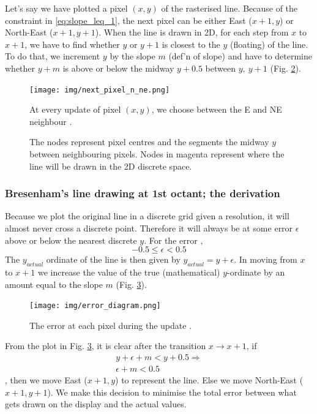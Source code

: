\documentclass[a4paper]{article}
\begin{document}
Let's say we have plotted a pixel $(x,y)$ of the rasterised line. Because of the constraint in \eqref{eq:slope_leq_1}, the next pixel can be either East ($x+1,y$) or North-East ($x+1,y+1$). When the line is drawn in 2D, for each step from $x$ to $x+1$, we have to find whether $y$ or $y+1$ is closest to the $y$ (floating) of the line. To do that, we increment $y$ by the slope $m$ (def'n of slope) and have to determine whether $y+m$ is above or below the midway $y+0.5$  between $y, \ y+1$ (Fig. \ref{fig:grid_line_1st_octant}).

\begin{multicols}{2}
	\begin{figure}[H]
		\centering
		\texttt{[image: img/next\_pixel\_n\_ne.png]}
		\caption{At every update of pixel $(x,y)$, we choose between the E and NE neighbour \cite{mdamian}.}
		\label{fig:}
	\end{figure}
\columnbreak
	\begin{figure}[H]
	\centering
	
	\caption{The nodes represent pixel centres and the segments the midway $y$ between neighbouring pixels. Nodes in magenta represent where the line will be drawn in the 2D discrete space.}
	\label{fig:grid_line_1st_octant}
\end{figure}


\end{multicols}

\subsubsection{Bresenham's line drawing at 1st octant; the derivation}

Because we plot the original line in a discrete grid given a resolution, it will almost never cross a discrete point. Therefore it will always be at some error $\epsilon$ above or below the nearest discrete $y$. For the error \cite{mallinus},
\begin{equation}
	-0.5 \leq \epsilon <0.5
\end{equation}
The $y_{actual}$ ordinate of the line is then given by $y_{actual} = y+\epsilon$. In moving from $x$ to $x+1$ we increase the value of the true (mathematical) $y$-ordinate by an amount equal to the slope $m$ (Fig. \ref{fig:error_diagram}).
\begin{figure}[H]
	\centering
	\texttt{[image: img/error\_diagram.png]}
	\caption{The error at each pixel during the update \cite{mallinus}.}
	\label{fig:error_diagram}
\end{figure}
From the plot in Fig. \ref{fig:error_diagram}, it is clear after the transition $x\rightarrow x+1$, if 
\begin{gather*}
	y + \epsilon + m < y+  0.5 \Rightarrow\\
	\epsilon + m < 0.5
\end{gather*}
, then we move East ($x+1,y$) to represent the line. Else we move North-East ($x+1,y+1$). We make this decision to minimise the total error between what gets drawn on the display and the actual values.
\end{document}
